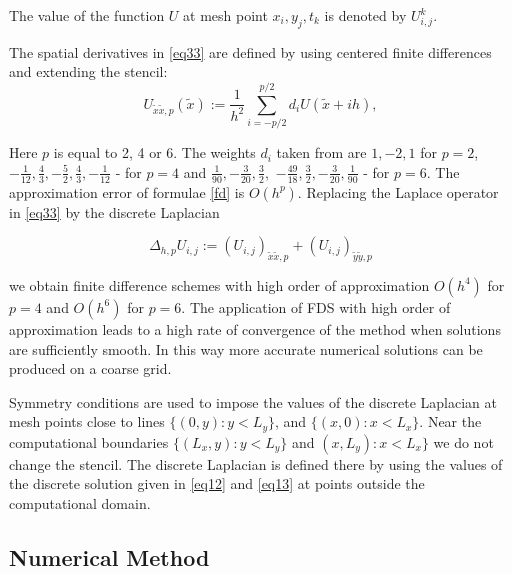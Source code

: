 \documentclass[12pt]{article}
\theoremstyle{theorem}
\theoremstyle{defi}
\begin{document}
The value of the function $U$ at mesh point $x_i,y_j,t_k$ is denoted by $U_{i,j}^k$.

\par
The spatial derivatives in \eqref{eq33} are defined by using centered finite differences  
and extending the stencil:
\begin{equation}\label{fd}
U_{{\tilde x \tilde x},p}(\tilde x) :=  \frac{1}{h^2} \sum\limits_{i=-p/2}^{p/2} d_i U(\tilde x+ih),
\end{equation}

Here $p$ is equal to 2, 4 or 6.  The weights $d_i$ taken from  \cite{ref17} are  
 $ 1,-2,1$ for $p=2$, 
$-\frac{1}{12}, \frac{4}{3}, -\frac{5}{2}, \frac{4}{3}, -\frac{1}{12}$ - for $p=4$
 and 
$\frac{1}{90}, -\frac{3}{20}, \frac{3}{2},$ $ -\frac{49}{18}, \frac{3}{2}, -\frac{3}{20}, \frac{1}{90}$ - for $p=6$. The approximation error of  formulae \eqref{fd} is $O(h^p)$. Replacing the Laplace operator in \eqref{eq33} by the discrete Laplacian 

$$ \Delta_{h,p} U_{i,j} := (U_{i,j})_{{\tilde x \tilde x},p} + (U_{i,j})_{{\tilde y \tilde y},p}$$ 

we obtain finite difference schemes with high order of approximation $O(h^4)$ for $p=4$ and  $O(h^6)$ for $p=6 $.  The application of FDS with high order of approximation leads to a high rate of convergence of the method when solutions are sufficiently smooth. In this way more accurate numerical solutions can be produced on a coarse grid.

Symmetry conditions are used to impose the values of the discrete Laplacian at mesh points close to lines $\{(0,y) : y < L_y\}$, and $\{(x,0) : x < L_x\}$. 
Near  the computational boundaries $\{(L_x,y):y<L_y\}$ and $(x,L_y):x<L_x\}$ we do not change the stencil. The discrete Laplacian
is defined  there by using the values of the discrete solution given in \eqref{eq12} and \eqref{eq13} at points outside the computational domain.

\subsection{Numerical Method}
\end{document}
